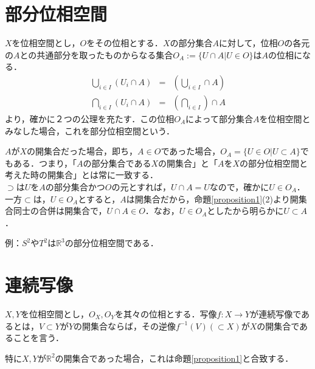 \documentclass[uplatex, 12pt, dvipdfmx]{jsreport}
\begin{document}
\section{部分位相空間}
$X$を位相空間とし，$O$をその位相とする．$X$の部分集合$A$に対して，位相$O$の各元の$A$との共通部分を取ったものからなる集合$O_A:=\{ U\cap A | U\in O \}$は$A$の位相になる．
\begin{eqnarray*}
    \bigcup_{i\in I}(U_i\cap A) &=& (\bigcup_{i\in I} \cap A) \\
    \bigcap_{i\in I}(U_i\cap A) &=& (\bigcap_{i\in I}) \cap A 
\end{eqnarray*}
より，確かに２つの公理を充たす．この位相$O_A$によって部分集合$A$を位相空間とみなした場合，これを部分位相空間という．\par

$A$が$X$の開集合だった場合，即ち，$A\in O$であった場合，$O_A=\{U\in O | U\subset A \}$でもある．つまり，「$A$の部分集合である$X$の開集合」と「$A$を$X$の部分位相空間と考えた時の開集合」とは常に一致する．\\
$\supset$は$U$を$A$の部分集合かつ$O$の元とすれば，$U\cap A=U$なので，確かに$U\in O_A$．一方$\subset$は，$U\in O_A$とすると，$A$は開集合だから，命題\ref{proposition1}(2)より開集合同士の合併は開集合で，$U\cap A \in O$．なお，$U\in O_A$としたから明らかに$U\subset A$．

例：$S^2やT^2$は$\mathbb{R}^3$の部分位相空間である．\\

\section{連続写像}

\begin{shadebox}\begin{definition}[連続写像]
    $X,Y$を位相空間とし，$O_X,O_Y$を其々の位相とする．写像$f:X\rightarrow Y$が連続写像であるとは，$V\subset Y$が$Y$の開集合ならば，その逆像$f^{-1}(V)(\subset X)$が$X$の開集合であることを言う．
\end{definition}\end{shadebox}
特に$X,Y$が$\mathbb{R}^2$の開集合であった場合，これは命題\ref{proposition1}と合致する．
\end{document}
